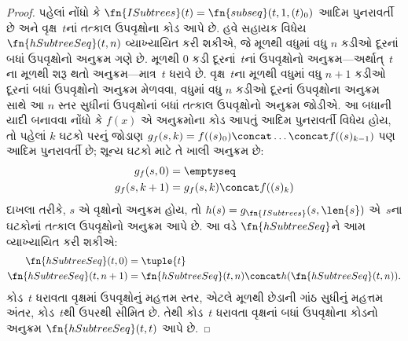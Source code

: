 \begin{proof}
  પહેલાં નોંધો કે $\fn{ISubtrees}(t) = \fn{subseq}(t, 1, (t)_0)$
  આદિમ પુનરાવર્તી છે અને વૃક્ષ~$t$નાં તત્કાલ ઉપવૃક્ષોના કોડ આપે
  છે. હવે સહાયક વિધેય $\fn{hSubtreeSeq}(t,n)$ વ્યાખ્યાયિત કરી
  શકીએ, જે મૂળથી વધુમાં વધુ $n$ કડીઓ દૂરનાં બધાં ઉપવૃક્ષોનો
  અનુક્રમ ગણે છે. મૂળથી $0$ કડી દૂરનાં~$t$નાં ઉપવૃક્ષોનો
  અનુક્રમ---અર્થાત્~$t$ના મૂળથી શરૂ થતો અનુક્રમ---માત્ર~$t$ ધરાવે છે.
  વૃક્ષ~$t$ના મૂળથી વધુમાં વધુ $n+1$ કડીઓ દૂરનાં બધાં ઉપવૃક્ષોનો
  અનુક્રમ મેળવવા, વધુમાં વધુ $n$ કડીઓ દૂરનાં ઉપવૃક્ષોના અનુક્રમ
  સાથે આ $n$ સ્તર સુધીનાં ઉપવૃક્ષોનાં બધાં તત્કાલ ઉપવૃક્ષોનો
  અનુક્રમ જોડીએ. આ બધાની યાદી બનાવવા નોંધો કે
  $f(x)$ એ અનુક્રમોના કોડ આપતું આદિમ પુનરાવર્તી વિધેય હોય, તો
  પહેલાં $k$ ઘટકો પરનું જોડાણ $g_f(s, k) = f((s)_0) \concat
  \dots \concat f((s)_{k-1})$ પણ આદિમ પુનરાવર્તી છે; શૂન્ય
  ઘટકો માટે તે ખાલી અનુક્રમ છે:
    \begin{align*}
      g_f(s, 0) & = \emptyseq\\
      g_f(s, k+1) & = g_f(s, k) \concat f((s)_k)
    \end{align*}
    દાખલા તરીકે, $s$ એ વૃક્ષોનો અનુક્રમ હોય, તો
    $h(s) = g_{\fn{ISubtrees}}(s, \len{s})$ એ~$s$ના ઘટકોનાં
    તત્કાલ ઉપવૃક્ષોનો અનુક્રમ આપે છે. આ વડે $\fn{hSubtreeSeq}$ને
    આમ વ્યાખ્યાયિત કરી શકીએ:
    \begin{align*}
      \fn{hSubtreeSeq}(t, 0) & = \tuple{t} \\
      \fn{hSubtreeSeq}(t, n+1) & = \fn{hSubtreeSeq}(t, n) \concat
      h(\fn{hSubtreeSeq}(t, n)).
    \end{align*}
    કોડ~$t$ ધરાવતા વૃક્ષમાં ઉપવૃક્ષોનું મહત્તમ સ્તર, એટલે મૂળથી
    છેડાની ગાંઠ સુધીનું મહત્તમ અંતર, કોડ~$t$થી ઉપરથી સીમિત છે.
    તેથી કોડ~$t$ ધરાવતા વૃક્ષનાં બધાં ઉપવૃક્ષોના કોડનો અનુક્રમ
    $\fn{hSubtreeSeq}(t, t)$ આપે છે.
\end{proof}

